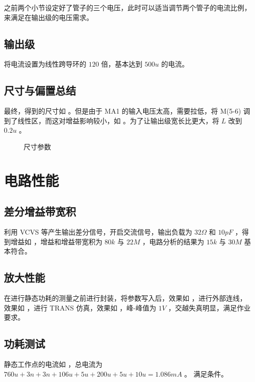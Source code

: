 \documentclass[lang=cn,11pt,a4paper,cite=authoryear]{elegantpaper}
\begin{document}
之前两个小节设定好了管子的三个电压，此时可以适当调节两个管子的电流比例，来满足在输出级的电压需求。

\subsection{输出级} 

将电流设置为线性跨导环的 \(120\) 倍，基本达到 \(500 u\) 的电流。

\subsection*{尺寸与偏置总结}

最终，得到的尺寸如  。但是由于 MA1 的输入电压太高，需要拉低，将 M(5-6) 调到了线性区，而这对增益影响较小，如  。为了让输出级宽长比更大，将 \(L\) 改到 \(0.2 u\) 。

\begin{figure}
    \caption{尺寸参数}\label{0304}
    \centering
\end{figure}


\section{电路性能}

\subsection{差分增益带宽积}

利用 VCVS 等产生输出差分信号，开启交流信号，输出负载为 \(32 \Omega\) 和 \(10 pF\) ，得到增益如  ，增益和增益带宽积为 \(80k\) 与 \(22 M\) ，电路分析的结果为 \(15 k\) 与 \(30 M\) 基本符合。


\subsection{放大性能} 

在进行静态功耗的测量之前进行封装，将参数写入后，效果如  ，进行外部连线，效果如  ，进行 TRANS 仿真，效果如  ，峰-峰值为 \(1 V\) ，交越失真明显，满足作业要求。




\subsection{功耗测试}

静态工作点的电流如  ，总电流为
\(760u + 3n + 3n + 106u + 5u + 200u + 5u + 10u = 1.086 mA\) 。
满足条件。

\end{document}
